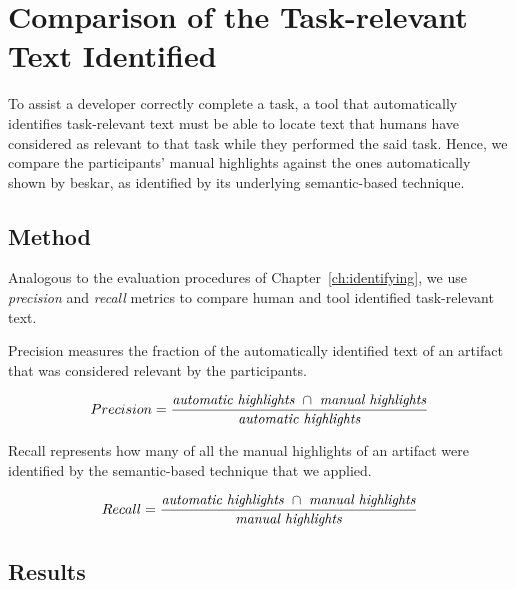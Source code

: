 \clearpage


\section{Comparison of the Task-relevant Text Identified}
\label{cp6:comparison}


To assist a developer correctly complete a task, a tool that
automatically identifies task-relevant text must be able to 
locate text that humans have considered as relevant to that task
while they performed the said task. 
Hence, we compare the participants' manual highlights against the ones 
automatically shown by \acs{beskar}, as 
  identified by its underlying semantic-based technique.
 





\subsection{Method}

Analogous to the evaluation procedures of Chapter~\ref{ch:identifying}, we use 
\textit{precision} and \textit{recall} metrics
to compare human and tool identified task-relevant text.




Precision measures the fraction of the automatically identified text of an artifact that was  considered relevant
by the participants.

\smallskip
\begin{small}


\begin{equation}
    Precision = \frac{
        \text{\textit{automatic highlights}~} \cap 
        \text{~\textit{manual highlights}}
    }{\text{\textit{automatic highlights}}}
\end{equation}
\end{small}


Recall represents how many of all the manual highlights of an artifact were identified by the semantic-based technique that we applied.

\smallskip
\begin{small}

\begin{equation}
    Recall = \frac{
        \text{\textit{automatic highlights}~} \cap 
        \text{~\textit{manual highlights}}
    }{\text{\textit{manual highlights}}}
\end{equation}
\end{small}

\medskip
{}




\subsection{Results}





